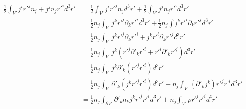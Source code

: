 \documentclass[12pt,a4]{article}
\begin{document}
\begin{enumerate}
\begin{enumerate}
\begin{align*}
        \frac{1}{2} \int_{V'} j^i  {r'}^j n_j + j^j n_j{r'}^id^3r' &= \frac{1}{2} \int_{V'} j^i  {r'}^j n_j d^3r' + \frac{1}{2} \int_{V'} j^j n_j{r'}^id^3r'\\
                                                              &= \frac{1}{2} n_j\int_{V'} j^k  {r'}^j \partial_k {r'}^i d^3r' + \frac{1}{2} n_j\int j^k {r'}^i\partial_k {r'}^j d^3r'\\
                                                              &= \frac{1}{2} n_j\int_{V'} j^k  {r'}^j \partial_k {r'}^i  +  j^k {r'}^i\partial_k {r'}^j d^3r'\\
                                                              &= \frac{1}{2} n_j\int_{V'} j^k  ({r'}^j\partial'_k {r'}^i  +  {r'}^i\partial'_k {r'}^j) d^3r'\\
                                                              &= \frac{1}{2} n_j\int_{V'} j^k \partial'_k ({r'}^j {r'}^i) d^3r'\\
                                                              &= \frac{1}{2} n_j\int_{V'} \partial'_k (j^k {r'}^j {r'}^i) d^3r' - n_j\int_{V'} (\partial'_k j^k) {r'}^j {r'}^i d^3r'\\
                                                              &= \frac{1}{2} n_j\int_{\partial V'} \partial'_k n_k j^k {r'}^j {r'}^i d^3r' + n_j\int_{V'} \dot \rho {r'}^j {r'}^i d^3r'  \\

\end{align*}
\end{enumerate}
\end{enumerate}
\end{document}
